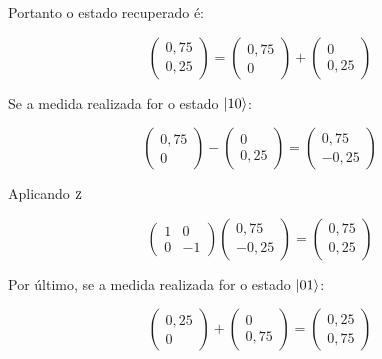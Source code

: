 Portanto o estado recuperado é:

\begin{equation}
\begin{pmatrix}
0,75 \\
0,25
\end{pmatrix} = \begin{pmatrix}
0,75 \\
0
\end{pmatrix} +  \begin{pmatrix}
0 \\
0,25
\end{pmatrix}
\end{equation}

Se a medida realizada for o estado $\ket{10}$:

\begin{equation}
\begin{pmatrix}
0,75 \\
0
\end{pmatrix} -  \begin{pmatrix}
0 \\
0,25
\end{pmatrix} = \begin{pmatrix}
0,75 \\
-0,25
\end{pmatrix}
\end{equation}

Aplicando \(\operatorname{\textsc{z}}\)

\begin{equation}
\begin{pmatrix}
1 & 0 \\
0 & -1
\end{pmatrix}\begin{pmatrix}
0,75 \\
-0,25
\end{pmatrix} = \begin{pmatrix}
0,75 \\
0,25
\end{pmatrix}
\end{equation}

Por último, se a medida realizada for o estado $\ket{01}$:

\begin{equation}
\begin{pmatrix}
0,25 \\
0
\end{pmatrix} +  \begin{pmatrix}
0 \\
0,75
\end{pmatrix} = \begin{pmatrix}
0,25 \\
0,75
\end{pmatrix}
\end{equation}

